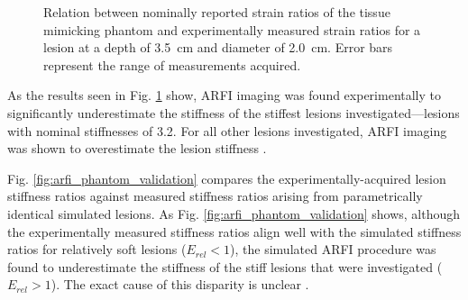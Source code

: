 			\begin{figure}[!htb]
				\centering
				\caption[Experimental ARFI model results]{Relation between nominally reported strain ratios of the tissue mimicking phantom and experimentally measured strain ratios for a lesion at a depth of \SI{3.5}{\cm} and diameter of \SI{2.0}{\cm}. Error bars represent the range of measurements acquired.}
				\label{fig:arfi_phantom_validation_nominal}
			\end{figure}

			As the results seen in Fig. \ref{fig:arfi_phantom_validation_nominal} show, ARFI imaging was found experimentally to significantly underestimate the stiffness of the stiffest lesions investigated---lesions with nominal stiffnesses of 3.2. For all other lesions investigated, ARFI imaging was shown to overestimate the lesion stiffness .

			Fig. \ref{fig:arfi_phantom_validation} compares the experimentally-acquired lesion stiffness ratios against measured stiffness ratios arising from parametrically identical simulated lesions. As Fig. \ref{fig:arfi_phantom_validation} shows, although the experimentally measured stiffness ratios align well with the simulated stiffness ratios for relatively soft lesions ($E_{rel} < 1$), the simulated ARFI procedure was found to underestimate the stiffness of the stiff lesions that were investigated ($E_{rel} > 1$). The exact cause of this disparity is unclear .

